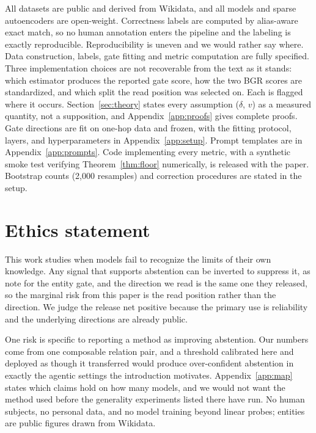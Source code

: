 \documentclass{article}
\newif\ifredflags
\newcommand{\rf}[1]{\ifredflags{\textcolor{red}{\textbf{[MISSING: #1]}}}\fi}
\begin{document}
All datasets are public and derived from Wikidata, and all models and sparse autoencoders are
open-weight. Correctness labels are computed by alias-aware exact match, so no human annotation enters
the pipeline and the labeling is exactly reproducible. Reproducibility is uneven and we would rather say where. Data construction, labels, gate fitting and
metric computation are fully specified. Three implementation choices are not recoverable from the text
as it stands: which estimator produces the reported gate score, how the two BGR scores are
standardized, and which split the read position was selected on. Each is flagged where it occurs. Section~\ref{sec:theory} states every
assumption ($\delta$, $v$) as a measured quantity, not a supposition, and Appendix~\ref{app:proofs}
gives complete proofs. Gate directions are fit on one-hop data and frozen, with the fitting protocol,
layers, and hyperparameters in Appendix~\ref{app:setup}. Prompt templates are in
Appendix~\ref{app:prompts}. Code implementing every metric, with a synthetic smoke test verifying
Theorem~\ref{thm:floor} numerically, is released with the paper.
Bootstrap counts (2{,}000 resamples) and correction procedures are stated in the setup.
\rf{the random seeds. No seed appears anywhere in the manuscript, so the sentence claiming they are
stated has been removed until they are.} \rf{the anonymous repository URL, or confirmation that the
code and benchmark ship as supplementary material. The abstract and this statement both promise a
release and no link is present.}

\section*{Ethics statement}

This work studies when models fail to recognize the limits of their own knowledge. Any signal that
supports abstention can be inverted to suppress it, as \citet{ferrando2025entity} note for the entity
gate, and the direction we read is the same one they released, so the marginal risk from this paper is
the read position rather than the direction. We judge the release net positive because the primary use
is reliability and the underlying directions are already public.

One risk is specific to reporting a method as improving abstention. Our numbers come from one
composable relation pair, and a threshold calibrated here and deployed as though it transferred would
produce over-confident abstention in exactly the agentic settings the introduction motivates.
Appendix~\ref{app:map} states which claims hold on how many models, and we would not want the method
used before the generality experiments listed there have run. No human subjects, no personal data, and
no model training beyond linear probes; entities are public figures drawn from Wikidata.
\end{document}
